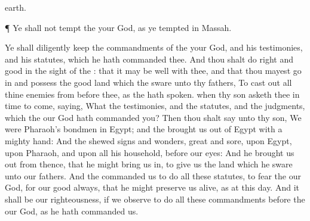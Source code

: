 {earth.
\par }{\PP {}¶ Ye shall not
tempt the
{} your
God, as ye
tempted
{} in
Massah.
\par }{\PP {}Ye shall
diligently
keep the
commandments of the
{} your
God, and his
testimonies, and his
statutes, which he hath
commanded thee.
And thou shalt
do
{}
right and
good in the
sight of the
{}: that it may be
well with thee, and that thou mayest go
in and
possess the
good
land which the
{}
sware unto thy
fathers,
To cast
out all thine
enemies from
before thee, as the
{} hath
spoken.
 when thy
son
asketh thee in time to
come,
saying, What
{} the
testimonies, and the
statutes, and the
judgments, which the
{} our
God hath
commanded you?
Then thou shalt
say unto thy
son, We were
Pharaoh’s
bondmen in
Egypt; and the
{} brought us
out of
Egypt with a
mighty
hand:
And the
{}
shewed
signs and
wonders,
great and
sore, upon
Egypt, upon
Pharaoh, and upon all his
household, before our
eyes:
And he brought us
out from thence, that he might bring us
in, to
give us the
land which he
sware unto our
fathers.
And the
{}
commanded us to
do all these
statutes, to
fear the
{} our
God, for our
good
always, that he might preserve us
alive, as
{} at this
day.
And it shall be our
righteousness, if we
observe to
do all
these
commandments
before the
{} our
God, as he hath
commanded us.

}
